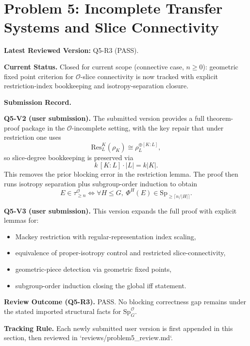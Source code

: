 \section{Problem 5: Incomplete Transfer Systems and Slice Connectivity}

\textbf{Latest Reviewed Version:} Q5-R3 (PASS).

\textbf{Current Status.}
Closed for current scope (connective case, $n\ge 0$): geometric fixed point criterion for $\mathcal O$-slice connectivity is now tracked with explicit restriction-index bookkeeping and isotropy-separation closure.

\textbf{Submission Record.}

\textbf{Q5-V2 (user submission).}
The submitted version provides a full theorem-proof package in the $\mathcal O$-incomplete setting, with the key repair that under restriction one uses
\[
\mathrm{Res}^{K}_{L}(\rho_K)\cong \rho_L^{\oplus [K:L]},
\]
so slice-degree bookkeeping is preserved via
\[
k\,[K:L]\cdot |L|=k|K|.
\]
This removes the prior blocking error in the restriction lemma. The proof then runs isotropy separation plus subgroup-order induction to obtain
\[
E\in \tau^{\mathcal O}_{\ge n}
\Longleftrightarrow
\forall H\le G,\ \Phi^H(E)\in \mathrm{Sp}_{\ge \lceil n/|H| \rceil}.
\]

\textbf{Q5-V3 (user submission).}
This version expands the full proof with explicit lemmas for:
\begin{itemize}
\item Mackey restriction with regular-representation index scaling,
\item equivalence of proper-isotropy control and restricted slice-connectivity,
\item geometric-piece detection via geometric fixed points,
\item subgroup-order induction closing the global iff statement.
\end{itemize}

\textbf{Review Outcome (Q5-R3).}
PASS. No blocking correctness gap remains under the stated imported structural facts for $\mathrm{Sp}^{\mathcal O}_G$.

\textbf{Tracking Rule.}
Each newly submitted user version is first appended in this section, then reviewed in `reviews/problem5_review.md`.
